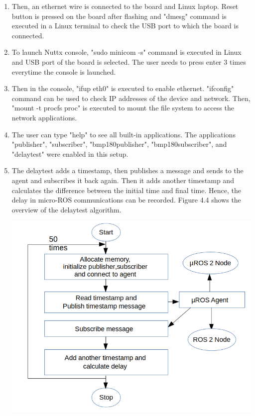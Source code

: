 \documentclass[%
xelatex,
	oneside,		%
	12pt,			%
	parskip=half,	%
	abstracton,
	chapterprefix=true%
    appendixprefix=true]
{scrbook}
\begin{document}
\begin{enumerate}
\begin{center}
[BMP180 Pressure Sensor]{BMP180 Pressure Sensor}
\label{fig:bmp180}
\end{center}
\item  Then, an ethernet wire is connected to the board and Linux laptop. Reset button is pressed on the board after flashing and "dmesg" command is executed in a Linux terminal to check the USB port to which the board is connected.
\item To launch Nuttx console, "sudo minicom -s" command is executed in Linux and USB port of the board is selected. The user needs to press enter 3 times everytime the console is launched.
\item Then in the console, "ifup eth0" is executed to enable ethernet. "ifconfig" command can be used to check IP addresses of the device and network. Then, "mount -t procfs proc" is executed to mount the file system to access the network applications.
\item The user can type "help" to see all built-in applications. The applications "publisher", "subscriber", "bmp180\textunderscore publisher", "bmp180\textunderscore subscriber", and "delay\textunderscore test" were enabled in this setup.
\item The delay\textunderscore test adds a timestamp, then publishes a message and sends to the agent and subscribes it back again. Then it adds another timestamp and calculates the difference between the initial time and final time. Hence, the delay in micro-ROS communications can be recorded. Figure 4.4 shows the overview of the delay\textunderscore test algorithm.
\begin{center}
\hspace*{-1cm}\includegraphics[scale=0.35]{fig/delay.png}


\end{center}
\end{enumerate}
\end{document}
